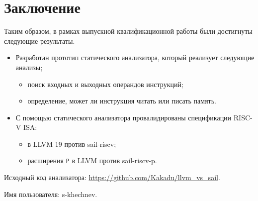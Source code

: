 
\section*{Заключение}

Таким образом, в рамках выпускной квалификационной работы были достигнуты следующие результаты.
\begin{itemize}
    \item Разработан прототип статического анализатора, который реализует следующие анализы;
          \begin{itemize}
              \item поиск входных и выходных операндов инструкций;
              \item определение, может ли инструкция читать или писать память.
          \end{itemize}
    \item С помощью статического анализатора провалидированы спецификации RISC-V ISA:
          \begin{itemize}
              \item в LLVM 19 против sail-riscv;
              \item расширения \texttt{P} в LLVM против sail-riscv-p.
          \end{itemize}

\end{itemize}

Исходный код анализатора: \url{https://github.com/Kakadu/llvm_vs_sail}.

Имя пользователя: s-khechnev.




